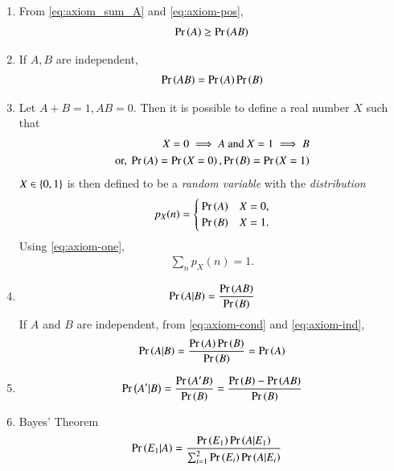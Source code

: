 \begin{enumerate}[label=\thesubsection.\arabic*,ref=\thesubsection.\theenumi]
\begin{proof}
\begin{align}
\label{eq:axiom_sum_ApB}
\end{align}
From 
\eqref{eq:axiom_sum_A}
and 
\eqref{eq:axiom_sum_ApB},
we obtain
\eqref{eq:axiom_sum_AB}.
		\end{proof}
	\item 
From \eqref{eq:axiom_sum_A}
and 
	\eqref{eq:axiom-pos},
\begin{align}
	\label{eq:axiom-prod-ge}
	\pr{A} \ge \pr{AB}
\end{align}
\item If $A, B$ are independent,
\begin{align}
	\pr{AB} = \pr{A}\pr{B}
\label{eq:axiom-ind}
\end{align}
\item Let $A + B = 1, AB = 0$.  Then it is possible to define a real number $X$ such that 
\begin{align}
	X = 0 \implies A \text{ and } X = 1 \implies B
	\\
	\text{or, }
	\Pr\left(A\right) = \Pr\left(X=0\right),
	\Pr\left(B\right) = \Pr\left(X=1\right)
\end{align}
$X \in \left\{0,1\right\}$ is then defined to be a {\em random variable} with the {\em distribution}
\begin{align}
	\label{eq:dist}
	p_X(n) = 
	\begin{cases}
		\pr{A} & X=0,
		\\
		\pr{B} & X=1.
\end{cases}
\end{align}
Using 
	\eqref{eq:axiom-one},
\begin{align}
	\sum_n p_X(n) = 1.
	\label{eq:dist-axiom-one}
\end{align}
\item 
\begin{align}
	\pr{A | B} = \frac{\pr{AB}}{\pr{B}}
\label{eq:axiom-cond}
\end{align}
If $A$ and $B$ are independent, from 
\eqref{eq:axiom-cond}
and 
\eqref{eq:axiom-ind},
\begin{align}
	\pr{A | B} = \frac{\pr{A}\pr{B}}{\pr{B}}={\pr{A}}
\label{eq:axiom-cond-ind}
\end{align}
\item 
\begin{align}
	\pr{A' | B} = \frac{\pr{A'B}}{\pr{B}} = \frac{\pr{B}-\pr{AB}}{\pr{B}}
\label{eq:axiom-cond-prime}
\end{align}
\item Bayes' Theorem
\begin{align}
	\pr{E_1|A} &= \frac{\pr{E_1}\pr{A|E_1}}{\sum_{i=1}^{2}\pr{E_i}\pr{A|E_i}}
\label{eq:axiom-bayes}
\end{align}
\end{enumerate}
